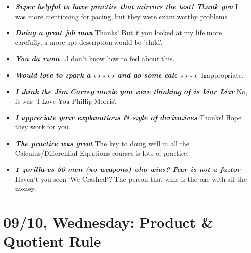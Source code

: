 \documentclass[11pt,letterpaper]{article}
\begin{document}
\begin{itemize}
\item {\bfseries\itshape Super helpful to have practice that mirrors the test! Thank you} I was more mentioning for pacing, but they were exam worthy problems.

\item {\bfseries\itshape Doing a great job man} Thanks! But if you looked at my life more carefully, a more apt description would be `child'. 

\item {\bfseries\itshape You da mom} \dots I don't know how to feel about this.

\item {\bfseries\itshape Would love to spark a $\star\star\star\star\star$ and do some calc $\star\star\star\star$} Inappropriate. 

\item {\bfseries\itshape I think the Jim Carrey movie you were thinking of is Liar Liar} No, it was `I Love You Phillip Morris'.

\item {\bfseries\itshape I appreciate your explanations \& style of derivatives} Thanks! Hope they work for you. 

\item {\bfseries\itshape The practice was great} The key to doing well in all the Calculus/Differential Equations courses is lots of practice. 

\item {\bfseries\itshape 1 gorilla vs 50 men (no weapons) who wins? Fear is not a factor} Haven't you seen `We Crashed'? The person that wins is the one with all the money. 
\end{itemize}

\newpage
\section*{09/10, Wednesday: Product \& Quotient Rule\label{09-10}}
\end{document}
